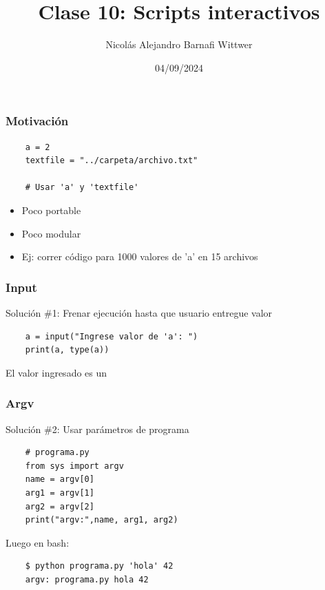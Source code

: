 \documentclass[14pt,aspectratio=169,xcolor=dvipsnames]{beamer}
\title[short title]{Clase 10: Scripts interactivos}
\subtitle{}
\author[NA Barnafi] {Nicolás Alejandro Barnafi Wittwer}
\institute[UC|CMM] 
{
    Pontificia Universidad Católica de Chile \\
    Centro de Modelamiento Matemático
}
\date{04/09/2024}
\begin{document}
\begin{frame}
    \maketitle
\end{frame}
\begin{frame}[fragile]\frametitle{Motivación}
    \begin{verbatim}
    a = 2
    textfile = "../carpeta/archivo.txt"
    
    # Usar 'a' y 'textfile'
    \end{verbatim}
    \begin{itemize}
        \item Poco portable
        \item Poco modular
        \item Ej: correr código para 1000 valores de 'a' en 15 archivos
    \end{itemize}

\pause {}
\end{frame}
\begin{frame}[fragile]\frametitle{Input}
    Solución \#1: Frenar ejecución hasta que usuario entregue valor
    
    \begin{verbatim}
    a = input("Ingrese valor de 'a': ")
    print(a, type(a))
    \end{verbatim}

    \vspace{1cm}
    El valor ingresado es un 
\end{frame}
\begin{frame}[fragile]\frametitle{Argv}
    Solución \#2: Usar parámetros de programa
    \begin{verbatim}
    # programa.py
    from sys import argv
    name = argv[0]
    arg1 = argv[1]
    arg2 = argv[2]
    print("argv:",name, arg1, arg2)
    \end{verbatim}

    Luego en bash:
    \begin{verbatim}
    $ python programa.py 'hola' 42
    argv: programa.py hola 42
    \end{verbatim}
\end{frame}
\end{document}
